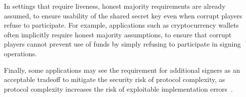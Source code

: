 In settings that require liveness,
honest majority requirements are already assumed,
to ensure usability of the shared secret key even when corrupt players refuse to participate.
For example,
applications such as cryptocurrency wallets often implicitly require honest majority assumptions,
to ensure that corrupt players cannot prevent use of funds by simply refusing to participate in signing operations.

Finally, some applications may see the requirement for additional signers as an acceptable tradeoff to mitigate the security risk of protocol complexity,
as protocol complexity increases the risk of exploitable implementation errors~\cite{MakriyannisYG23}.










